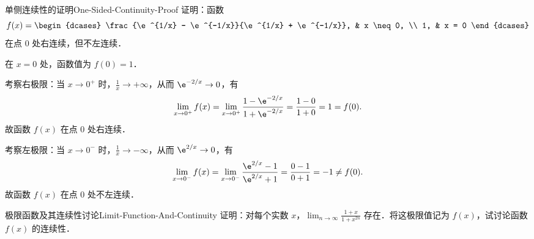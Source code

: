 \begin{problem}{单侧连续性的证明}{One-Sided-Continuity-Proof}
    证明：函数
    \begin{equation}
        f(x) = \begin{dcases} \frac{\e^{1/x} - \e^{-1/x}}{\e^{1/x} + \e^{-1/x}}, & x \neq 0, \\ 1, & x = 0 \end{dcases}
    \end{equation}
    在点 $0$ 处右连续，但不左连续．
\end{problem}

\begin{myproof}
    在 $x = 0$ 处，函数值为 $f(0) = 1$．

    考察右极限：当 $x \to 0^+$ 时，$\frac{1}{x} \to +\infty$，从而 $\e^{-2/x} \to 0$，有
    \begin{equation}
        \lim_{x\to 0^+} f(x) = \lim_{x\to 0^+} \frac{1 - \e^{-2/x}}{1 + \e^{-2/x}} = \frac{1 - 0}{1 + 0} = 1 = f(0).
    \end{equation}
    故函数 $f(x)$ 在点 $0$ 处右连续．

    考察左极限：当 $x \to 0^-$ 时，$\frac{1}{x} \to -\infty$，从而 $\e^{2/x} \to 0$，有
    \begin{equation}
        \lim_{x\to 0^-} f(x) = \lim_{x\to 0^-} \frac{\e^{2/x} - 1}{\e^{2/x} + 1} = \frac{0 - 1}{0 + 1} = -1 \neq f(0).
    \end{equation}
    故函数 $f(x)$ 在点 $0$ 处不左连续．
\end{myproof}

\begin{problem}{极限函数及其连续性讨论}{Limit-Function-And-Continuity}
    证明：对每个实数 $x$，$\lim_{n\to\infty} \frac{1+x}{1+x^{2n}}$ 存在．将这极限值记为 $f(x)$，试讨论函数 $f(x)$ 的连续性．
\end{problem}

